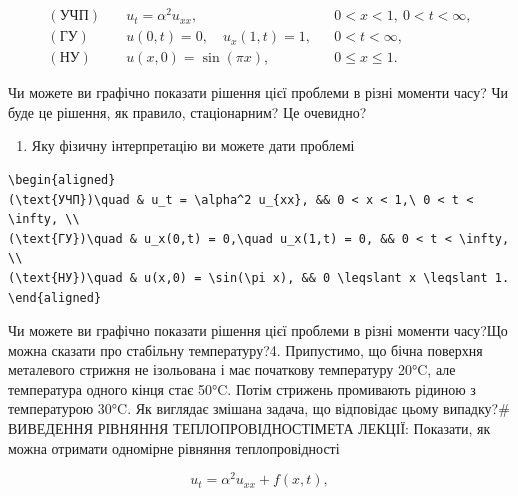 \documentclass[
  ukrainian,
]{article}
\providecommand{\tightlist}{%
  \setlength{\itemsep}{0pt}\setlength{\parskip}{0pt}}
\begin{document}
\[
\begin{aligned}
(\text{УЧП})\quad & u_t = \alpha^2 u_{xx}, && 0 < x < 1,\ 0 < t < \infty, \\
(\text{ГУ})\quad & u(0,t) = 0,\quad u_x(1,t) = 1, && 0 < t < \infty, \\
(\text{НУ})\quad & u(x,0) = \sin(\pi x), && 0 \leqslant x \leqslant 1.
\end{aligned}
\]

Чи можете ви графічно показати рішення цієї проблеми в різні моменти
часу? Чи буде це рішення, як правило, стаціонарним? Це очевидно?

\begin{enumerate}
\def\labelenumi{\arabic{enumi}.}
\setcounter{enumi}{2}
\tightlist
\item
  Яку фізичну інтерпретацію ви можете дати проблемі
\end{enumerate}

\begin{verbatim}
\begin{aligned}
(\text{УЧП})\quad & u_t = \alpha^2 u_{xx}, && 0 < x < 1,\ 0 < t < \infty, \\
(\text{ГУ})\quad & u_x(0,t) = 0,\quad u_x(1,t) = 0, && 0 < t < \infty, \\
(\text{НУ})\quad & u(x,0) = \sin(\pi x), && 0 \leqslant x \leqslant 1.
\end{aligned}
\end{verbatim}

Чи можете ви графічно показати рішення цієї проблеми в різні моменти
часу?Що можна сказати про стабільну температуру?4. Припустимо, що бічна
поверхня металевого стрижня не ізольована і має початкову температуру
20°C, але температура одного кінця стає 50°C. Потім стрижень промивають
рідиною з температурою 30°C. Як виглядає змішана задача, що відповідає
цьому випадку?\# ВИВЕДЕННЯ РІВНЯННЯ ТЕПЛОПРОВІДНОСТІМЕТА ЛЕКЦІЇ:
Показати, як можна отримати одномірне рівняння теплопровідності

\[
u_t = \alpha^2 u_{xx} + f(x, t),
\]
\end{document}
